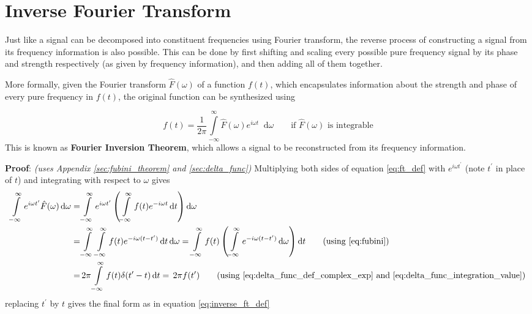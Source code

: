 \documentclass[11pt, a4paper]{article}
\let\oldsection\section
\renewcommand{\section}{%
	\setcounter{equation}{0}%
	\oldsection%
}
\newcommand{\eqrefnp}[1]{\textup{\ref{#1}}}  %
\newcommand{\primed}[1]{#1^{\prime}}
\newcommand{\tp}{\primed{t}}	%
\newcommand{\diff}{\mathop{}\!\mathrm{d}}
\newcommand{\dt}{\diff t}
\newcommand{\domega}{\diff \omega}
\newcommand{\dint}[2]{\int \limits_{#1}^{#2}}  %
\newcommand{\intinfty}{\dint{-\infty}{\infty}}	%
\newcommand{\iintinfty}{\intinfty \intinfty}	%
\begin{document}
	\section{Inverse Fourier Transform}\label{sec:inverse_fourier_transform}
	Just like a signal can be decomposed into constituent frequencies using Fourier transform, the reverse process of constructing a signal from its frequency information is also possible. This can be done by first shifting and scaling every possible pure frequency signal by its phase and strength respectively (as given by frequency information), and then adding all of them together.
	
	More formally, given the Fourier transform $\hat{F}(\omega)$ of a function $f(t)$, which encapsulates information about the strength and phase of every pure frequency in $f(t)$, the original function can be synthesized using
	
	\begin{equation}\label{eq:inverse_ft_def}
		\boxed{
			f(t) = \frac{1}{2\pi} \intinfty \hat{F}(\omega)e^{i\omega t} \domega
		} \qquad \text{if $\hat{F}(\omega)$ is integrable}
	\end{equation}
	This is known as \textbf{Fourier Inversion Theorem}, which allows a signal to be reconstructed from its frequency information. \cite{herman2016fourieranalysis}
	
	\vspace{4pt}
	\textbf{Proof}: \textit{(uses Appendix \ref{sec:fubini_theorem} and \ref{sec:delta_func})} Multiplying both sides of equation \eqref{eq:ft_def} with $e^{i\omega \tp}$ (note $\tp$ in place of $t$) and integrating with respect to $\omega$ gives
	\begin{align*}
		\intinfty e^{i\omega \tp} \hat{F}(\omega) \domega 
		= & \intinfty e^{i\omega \tp} \left(\intinfty f(t) e^{-i\omega t} \dt \right) \domega \\
		= & \iintinfty f(t) e^{-i\omega (t - \tp)} \dt \domega
		= \intinfty f(t) \left(\intinfty  e^{-i\omega (t - \tp)} \domega \right) \dt \tag{using \eqrefnp{eq:fubini}} \\
		= & \, 2 \pi \intinfty f(t) \delta (\tp - t) \dt = \, 2 \pi f(\tp) \tag{using \eqrefnp{eq:delta_func_def_complex_exp} and \eqrefnp{eq:delta_func_integration_value}}
	\end{align*} 
	replacing $\tp$ by $t$ gives the final form as in equation \eqref{eq:inverse_ft_def}
	
\end{document}
